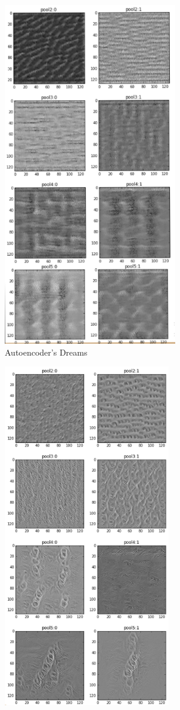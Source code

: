 \documentclass[12pt, a4paper]{article}
\begin{document}
\begin{figure}[h] 
\begin{subfigure}{0.5\textwidth}
\includegraphics[width=\linewidth,height=15cm]{autoencoder_dream.png} 
\caption{Autoencoder's Dreams}
\label{fig:autoencodersdream}
\end{subfigure}
\begin{subfigure}{0.5\textwidth}
\includegraphics[width=\linewidth, height=15cm]{unet_dream.png}

\end{subfigure}
\end{figure}
\end{document}

